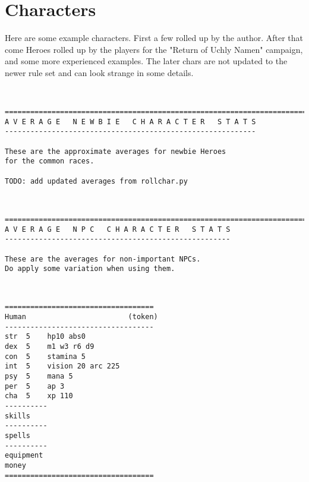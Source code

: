 

\cleardoublepage

\chapter*{Characters}

Here are some example characters. First a few rolled up by the author. After that come Heroes rolled up by the players for the "Return of Uchly Namen" campaign, and some more experienced examples. The later chars are not updated to the newer rule set and can look strange in some details.

\


 {}
\tiny \begin{samepage} \begin{verbatim}
================================================================================
A V E R A G E   N E W B I E   C H A R A C T E R   S T A T S
-----------------------------------------------------------

These are the approximate averages for newbie Heroes
for the common races.

TODO: add updated averages from rollchar.py
\end{verbatim} \end{samepage} \normalsize

\

 {}
\tiny \begin{samepage} \begin{verbatim}
================================================================================
A V E R A G E   N P C   C H A R A C T E R   S T A T S
-----------------------------------------------------

These are the averages for non-important NPCs.
Do apply some variation when using them.
\end{verbatim} \end{samepage} \normalsize

\

\pagebreak[1]
\tiny \begin{samepage} \begin{verbatim}
===================================
Human                        (token)
-----------------------------------
str  5    hp10 abs0
dex  5    m1 w3 r6 d9
con  5    stamina 5
int  5    vision 20 arc 225
psy  5    mana 5
per  5    ap 3
cha  5    xp 110
----------
skills
----------
spells
----------
equipment
money
===================================
\end{verbatim} \end{samepage} \normalsize

